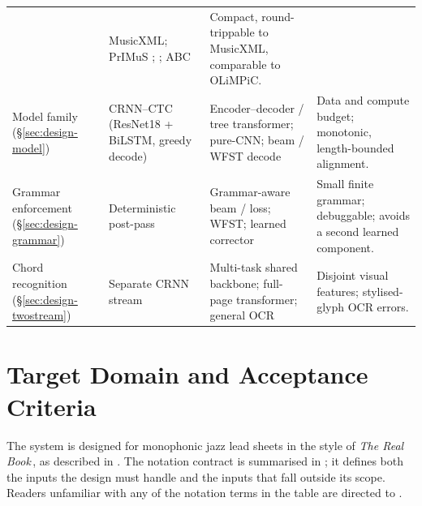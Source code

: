 \begin{table}[ht]
\begin{tabularx}{\linewidth}{@{} >{\raggedright\arraybackslash}p{2.5cm} >{\raggedright\arraybackslash}p{2.4cm} L L @{}}
  & MusicXML; PrIMuS ; ; ABC
  & Compact, round-trippable to MusicXML, comparable to OLiMPiC. \\
\tfgrowsep
Model family (\S\ref{sec:design-model})
  & CRNN--CTC (ResNet18 + BiLSTM, greedy decode)
  & Encoder--decoder / tree transformer; pure-CNN; beam / WFST decode
  & Data and compute budget; monotonic, length-bounded alignment. \\
\tfgrowsep
Grammar enforcement (\S\ref{sec:design-grammar})
  & Deterministic post-pass
  & Grammar-aware beam / loss; WFST; learned corrector
  & Small finite grammar; debuggable; avoids a second learned component. \\
\tfgrowsep
Chord recognition (\S\ref{sec:design-twostream})
  & Separate CRNN stream
  & Multi-task shared backbone; full-page transformer; general OCR
  & Disjoint visual features; stylised-glyph OCR errors. \\
\bottomrule
\end{tabularx}
\end{table}

\section{Target Domain and Acceptance Criteria}
\label{sec:design-domain}

The system is designed for monophonic jazz lead sheets in the style of
\textit{The Real Book}\,\cite{kernfeldStoryFakeBooks2006}, as described
in .
The notation contract is summarised in ; it
defines both the inputs the design must handle and the inputs that
fall outside its scope.
Readers unfamiliar with any of the notation terms in the table are
directed to .

